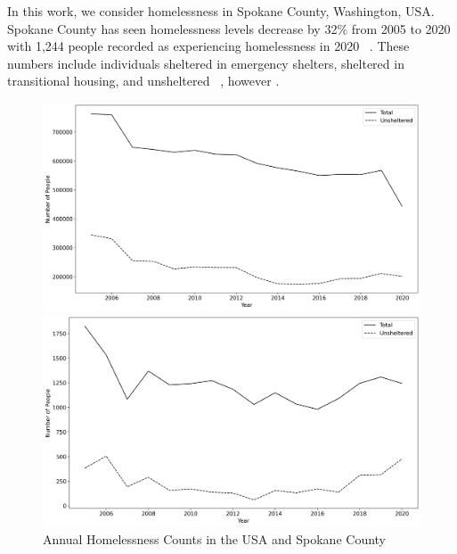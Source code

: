 \documentclass[10pt,letterpaper]{article}
\newcommand{\red}[1]{{\color{red}{#1}}}
\begin{document}
In this work, we consider homelessness in Spokane County, Washington, USA.  Spokane County has seen  homelessness levels decrease by 32\% from 2005 to 2020 with 1,244 people recorded as experiencing homelessness in 2020 ~\cite{PITcount}. These numbers include individuals sheltered in emergency shelters, sheltered in transitional housing, and unsheltered ~\cite{PITcount}, however \red{some fear PIT counts far underestimate homeless numbers*****}.  


\begin{figure}[H]
    \begin{minipage}{0.5\textwidth}
        \includegraphics[width=\textwidth]{../img/homelessness_usa.png} 
    \end{minipage}
    \begin{minipage}{0.5\textwidth}
        \includegraphics[width=\textwidth]{../img/homelessness_spokane.png}
    \end{minipage}
    \caption[Annual Homelessness Counts in the USA and Spokane County]{Annual Homelessness Counts in the USA and Spokane County
    ~\cite{PITcount}   \\ \red{font size need to be far larger on axes, perhaps thicker lines in plots}    }
    \label{fig:Homeless_US_Spokane}
\end{figure}
\end{document}
